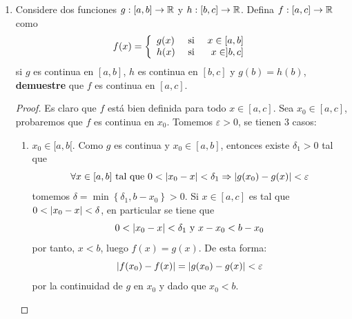 \documentclass[12pt]{article}
\begin{document}
\begin{enumerate}
    \item Considere dos funciones $g:[a,b]\rightarrow\mathbb{R}$ y $h:[b,c]\rightarrow\mathbb{R}$. Defina $f:[a,c]\rightarrow\mathbb{R}$ como
    \begin{equation*}
        f(x)=\left\{
            \begin{array}{lcr}
                g(x) & \textup{ si } & x\in[a,b] \\
                h(x) & \textup{ si } & x\in]b,c] \\
            \end{array}
        \right.
    \end{equation*}
    si $g$ es continua en $[a,b]$, $h$ es continua en $[b,c]$ y $g(b)=h(b)$, \textbf{demuestre} que $f$ es continua en $[a,c]$.

    \begin{proof}
        Es claro que $f$ está bien definida para todo $x\in[a,c]$. Sea $x_0\in[a,c]$, probaremos que $f$ es continua en $x_0$. Tomemos $\varepsilon>0$, se tienen 3 casos:
        \begin{enumerate}
            \item $x_0\in[a,b[$. Como $g$ es continua y $x_0\in[a,b]$, entonces existe $\delta_1>0$ tal que
            \begin{equation*}
                \forall x\in[a,b]\textup{ tal que }0<\left| x_0-x \right|<\delta_1\Rightarrow \left| g(x_0)-g(x) \right|<\varepsilon
            \end{equation*}
            tomemos $\delta=\min\left\{\delta_1,b-x_0 \right\}>0$. Si $x\in[a,c]$ es tal que $0<\left| x_0-x \right|<\delta$, en particular se tiene que
            \begin{equation*}
                0<\left| x_0-x \right|<\delta_1\textup{ y }x-x_0<b-x_0
            \end{equation*}
            por tanto, $x<b$, luego $f(x)=g(x)$. De esta forma:
            \begin{equation*}
                \left| f(x_0)-f(x) \right|=\left| g(x_0)-g(x) \right|<\varepsilon
            \end{equation*}
            por la continuidad de $g$ en $x_0$ y dado que $x_0<b$.
            

\end{enumerate}
\end{proof}
\end{enumerate}
\end{document}
